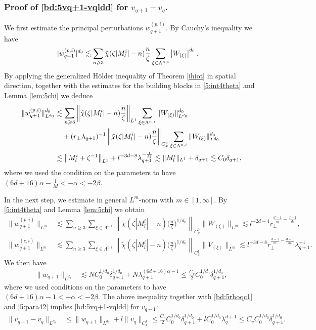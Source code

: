 \documentclass[UTF-8,reqno]{amsart}
\numberwithin{equation}{section}
\theoremstyle{definition}
\def\({{\Big(}}
\def\){{\Big)}}
\newcommand{\norm}[1]{\left\|#1\right\|}
\def\geq{\geqslant}
\def\leq{\leqslant}
\def\({{\Big(}}
\def\){{\Big)}}
\def\geq{\geqslant}
\def\leq{\leqslant}
\begin{document}
\subsubsection{Proof of  \eqref{bd:5vq+1-vqldd}  for $v_{q+1}-v_q$.}
We first estimate the principal perturbations ${w}^{(p,i)}_{q+1}$. By Cauchy's inequality  we have
\begin{align}
|w_{q+1}^{(p,i)}|^{d_0}  
&\lesssim \sum_{n\geq3}\tilde{\chi}(\zeta |M^i_l|-n)\frac{n}{\zeta }\sum_{\xi\in\Lambda^{n,i}}\left|W_{ (\xi)}\right|^{d_0}.\notag
\end{align} 
By applying the generalized H\"older inequality of 
Theorem \ref{ihiot} in spatial direction, together with the estimates for the building blocks in \eqref{5:int4theta} and Lemma \ref{lem:5chi} we deduce 
\begin{align}
\|w_{q+1}^{(p,i)}\|^{d_0}_{L^{d_0}} 
&\lesssim\sum_{n\geq3}\norm{\tilde{\chi}(\zeta |M^i_l |-n)\frac{n}{\zeta }}_{L^1}\sum_{\xi\in\Lambda^{n,i}}\|W_{ (\xi)}\|_{L^{d_0}}^{d_0}\notag\\ 
&\quad+(r_\perp\lambda_{q+1})^{-1}\norm{\tilde{\chi}(\zeta |M^i_l |-n)\frac{n}{\zeta }}_ {C_{x}^1}\sum_{\xi\in\Lambda^{n,i}}\|W_{ (\xi)}\|_{L^{d_0}}^{d_0} \notag\\
&\lesssim\norm{ M^i_l +\zeta ^{-1}}_{L^1}+l^{-3d-8}\lambda_{q+1}^{-\frac{1}{M}} \lesssim \|M^i_l \|_{L^1}+ \delta_{q+1}\lesssim C_0 \delta_{q+1}
,\notag
\end{align}
where we used  the condition on the parameters to have $(6d+16)\alpha-\frac{1}{M}<-\alpha<-2\beta$. 

In the next step, we estimate in  general $L^m$-norm with $m\in[1,\infty]$. By  \eqref{5:int4theta}   and   Lemma \ref{lem:5chi} we obtain
\begin{align}
\|w_{q+1}^{(p,i)}\|_{L^m}&\lesssim\sum_{n\geq3}\sum_{\xi\in\Lambda^{n,i}}\norm{\tilde{\chi}(\zeta |M^i_l|-n)\(\frac{n}{\zeta }\)^{1/d_0}}_ {C_{x}^0}\|W_{ (\xi)}\|_{L^m}\lesssim l^{-2d-4}r_\perp^{\frac{d-1}{m}-\frac{d-1}{d_0}} ,\label{bd:5wq+1plp}\\
\|w_{q+1}^{(c,i)}\|_{L^m}&\lesssim\sum_{n\geq3}\sum_{\xi\in\Lambda^{n,i}}\norm{\tilde{\chi}(\zeta |M^i_l|-n)\(\frac{n}{\zeta }\)^{1/d_0}}_{C^1_{x}}\|V_{ (\xi)}\|_{L^m}\lesssim l^{-3d-8}r_\perp^{\frac{d-1}{m}-\frac{d-1}{d_0}}\lambda_{q+1}^{-1}.\label{bd:5wq+1clp}
\end{align}
 We then have
\begin{align}
\|w_{q+1}\|_{L^{d_0}}%
&\lesssim NC_0^{1/d_0} \delta_{q+1}^{1/d_0}+N\lambda_{q+1}^{(6d+16)\alpha-1} \leq \frac{C_v}2C_0^{1/d_0}\delta_{q+1}^{1/d_0},\label{bd:5wq+1l2}\end{align}
where we used  conditions on the parameters to have
$(6d+16)\alpha-1<-\alpha<-2\beta$. 
The above inequality together with  \eqref{bd:5rhoqc1} and \eqref{5:para42} implies \eqref{bd:5vq+1-vqldd} for $v_{q+1}$:
\begin{align*}
\|v_{q+1}-v_{q}\|_{L^{d_0}}&\leq \|w_{q+1}\|_{L^{d_0}}+l\|v_{q}\|_ {C_{x}^1}
\leq \frac{ {C}_v}2C_0^{1/d_0}\delta_{q+1}^{1/d_0}+lC_0^{1/d_0}\lambda_{q}^{ d+1}\leq C_vC_0^{1/d_0}\delta_{q+1}^{1/d_0}.
\end{align*} 
\end{document}
